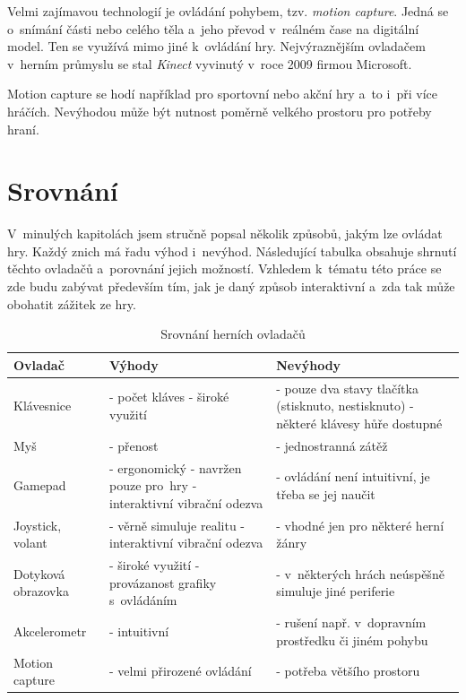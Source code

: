 \documentclass[thesis=B,czech,hidelinks]{FITthesis}[2012/06/26] %
\begin{document}
Velmi zajímavou technologií je ovládání pohybem, tzv. \textit{motion capture}. Jedná se o~snímání části nebo celého těla a~jeho převod v~reálném čase na digitální model. Ten se využívá mimo jiné k~ovládání hry. Nejvýraznějším ovladačem v~herním průmyslu se stal \textit{Kinect} vyvinutý v~roce 2009 firmou Microsoft. \cite{meetthekinect}

Motion capture se hodí například pro sportovní nebo akční hry a~to i~při více hráčích. Nevýhodou může být nutnost poměrně velkého prostoru pro potřeby hraní.

\section{Srovnání}

V~minulých kapitolách jsem stručně popsal několik způsobů, jakým lze ovládat hry. Každý znich má řadu výhod i~nevýhod. Následující tabulka obsahuje shrnutí těchto ovladačů a~porovnání jejich možností. Vzhledem k~tématu této práce se zde budu zabývat především tím, jak je daný způsob interaktivní a~zda tak může obohatit zážitek ze hry.

\begin{table}[h]
\caption{Srovnání herních ovladačů}
\begin{tabularx}{\textwidth}{|l|X|X|}
\hline
\textbf{Ovladač} & \textbf{Výhody} & \textbf{Nevýhody} \\ \hline
Klávesnice & - počet kláves \newline - široké využití & - pouze dva stavy tlačítka (stisknuto, nestisknuto) \newline - některé klávesy hůře dostupné \\ \hline
Myš & - přenost & - jednostranná zátěž \\ \hline
Gamepad & - ergonomický \newline - navržen pouze pro~hry \newline - interaktivní vibrační odezva & - ovládání není intuitivní, je třeba se jej naučit \\ \hline
Joystick, volant & - věrně simuluje realitu \newline - interaktivní vibrační odezva & - vhodné jen pro některé herní žánry \\ \hline
Dotyková obrazovka & - široké využití \newline - provázanost grafiky s~ovládáním & - v~některých hrách neúspěšně simuluje jiné periferie \\ \hline
Akcelerometr & - intuitivní & - rušení např. v~dopravním prostředku či jiném pohybu \\ \hline
Motion capture & - velmi přirozené ovládání & - potřeba většího prostoru \\ \hline

\end{tabularx}
\end{table}
\end{document}
